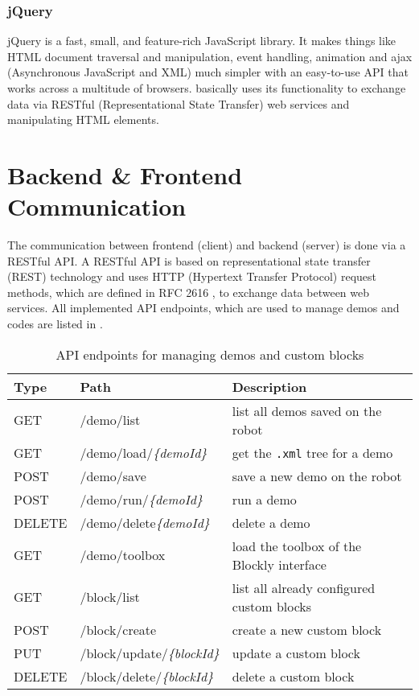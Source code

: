 \subsubsection{jQuery}
jQuery is a fast, small, and feature-rich JavaScript library. It makes things like HTML document traversal and manipulation, event handling, animation and ajax (Asynchronous JavaScript and XML) much simpler with an easy-to-use API that works across a multitude of browsers. \toolname{} basically uses its functionality to exchange data via RESTful (Representational State Transfer) web services and manipulating HTML elements.

\section{Backend \& Frontend Communication}
The communication between frontend (client) and backend (server) is done via a RESTful API. A RESTful API is based on representational state transfer (REST) technology and uses HTTP (Hypertext Transfer Protocol) request methods, which are defined in RFC 2616 \cite{RFC2616}, to exchange data between web services. All implemented API endpoints, which are used to manage demos and codes are listed in .

\begin{table}[htbp]
	\centering
	\begin{tabular}{l l l}
		\toprule
		Type   & Path                               & Description                                     \\
		\midrule
		GET    & /demo/list                         & list all demos saved on the robot               \\
		GET    & /demo/load/\textit{\{demoId\}}     & get the \lstinline!.xml! tree for a demo        \\
		POST   & /demo/save                         & save a new demo on the robot                    \\
		POST   & /demo/run/\textit{\{demoId\}}      & run a demo                                      \\
		DELETE & /demo/delete\textit{\{demoId\}}    & delete a demo                                   \\
		GET    & /demo/toolbox                      & load the toolbox of the Blockly interface       \\
		GET    & /block/list                        & list all already configured custom blocks       \\
		POST   & /block/create                      & create a new custom block                       \\
		PUT    & /block/update/\textit{\{blockId\}} & update a custom block                           \\
		DELETE & /block/delete/\textit{\{blockId\}} & delete a custom block                           \\
		\bottomrule
	\end{tabular}
	\caption{API endpoints for managing demos and custom blocks}
	\label{tab:APIspec}
\end{table}


